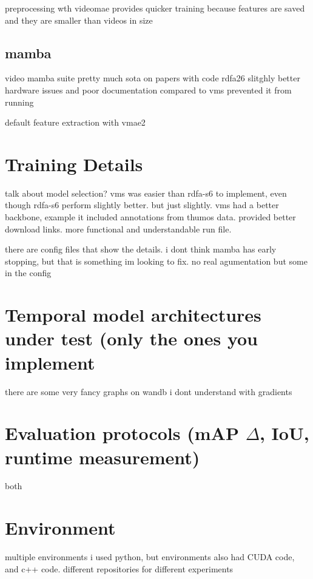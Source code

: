 preprocessing wth videomae provides quicker training because features are saved and they are smaller than videos in size

\subsection{mamba}
\label{ssec:mamba}

video mamba suite pretty much sota on papers with code
rdfa26 slitghly better
hardware issues and poor documentation compared to vms prevented it from running


default feature extraction with vmae2

\section{Training Details}

talk about model selection? vms was easier than rdfa-s6 to implement, even though rdfa-s6 perform slightly better. but just slightly. vms had a better backbone, example it included annotations from thumos data. provided better download links. more functional and understandable run file. 

there are config files that show the details. i dont think mamba has early stopping, but that is something im looking to fix. no real agumentation but some in the config

\section{Temporal model architectures under test (only the ones you implement}

there are some very fancy graphs on wandb i dont understand with gradients

\section{Evaluation protocols (mAP $\Delta$, IoU, runtime measurement)}

both 

\section{Environment} 

multiple environments
i used python, but environments also had CUDA code, and c++ code. 
different repositories for different experiments


